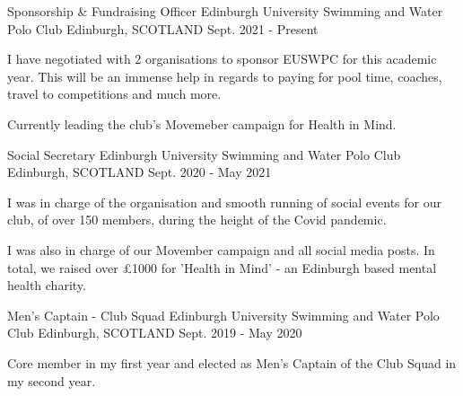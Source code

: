 

\begin{cventries}
  \cventry
    {Sponsorship \& Fundraising Officer} %
    {Edinburgh University Swimming and Water Polo Club} %
    {Edinburgh, SCOTLAND} %
    {Sept. 2021 - Present} %
    {
      \begin{cvitems} %
        \item I have negotiated with 2 organisations to sponsor EUSWPC for this academic year. This will be an immense help in regards to paying for pool time, coaches, travel to competitions and much more.
        \item Currently leading the club's Movemeber campaign for Health in Mind.
      \end{cvitems}
    }
    \vspace{.08cm}
    
  \cventry
    {Social Secretary} %
    {Edinburgh University Swimming and Water Polo Club} %
    {Edinburgh, SCOTLAND} %
    {Sept. 2020 - May 2021} %
    {
      \begin{cvitems} %
        \item I was in charge of the organisation and smooth running of social events for our club, of over 150 members, during the height of the Covid pandemic.
        \item I was also in charge of our Movember campaign and all social media posts. In total, we raised over £1000 for 'Health in Mind' - an Edinburgh based mental health charity.
      \end{cvitems}
    }
    \vspace{.08cm}
    
  \cventry
    {Men's Captain - Club Squad} %
    {Edinburgh University Swimming and Water Polo Club} %
    {Edinburgh, SCOTLAND} %
    {Sept. 2019 - May 2020} %
    {
      \begin{cvitems} %
        \item Core member in my first year and elected as Men's Captain of the Club Squad in my second year.
      \end{cvitems}
    }
    \vspace{.08cm}
\end{cventries}
